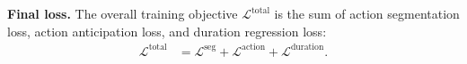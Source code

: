\noindent
\textbf{Final loss.} The overall training objective $\mathcal{L}^{\mathrm{total}}$ is the sum of action segmentation loss, action anticipation loss, and duration regression loss:
\begin{align}
    \mathcal{L}^{\mathrm{total}} &=\mathcal{L}^{\mathrm{seg}}+ \mathcal{L}^{\mathrm{action}} + \mathcal{L}^{\mathrm{duration}}.
\end{align}
